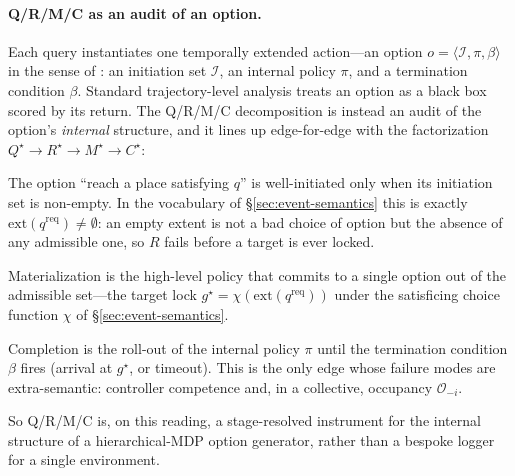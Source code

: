 \documentclass{article}
\begin{document}
\paragraph{Q/R/M/C as an audit of an option.}
Each query instantiates one temporally extended action---an option
$o=\langle \mathcal{I},\pi,\beta\rangle$ in the sense of
\citet{sutton1999between}: an initiation set $\mathcal{I}$, an internal
policy $\pi$, and a termination condition $\beta$. Standard
trajectory-level analysis treats an option as a black box scored by its
return. The Q/R/M/C decomposition is instead an audit of the option's
\emph{internal} structure, and it lines up edge-for-edge with the
factorization $Q^\star\!\rightarrow\!R^\star\!\rightarrow\!M^\star\!\rightarrow\!C^\star$:
\begin{description}[leftmargin=14pt,topsep=2pt,itemsep=2pt]
\item[$Q^\star\!\rightarrow\!R^\star$ (initiation).] The option ``reach a place satisfying $q$'' is well-initiated only when its initiation set is non-empty. In the vocabulary of \S\ref{sec:event-semantics} this is exactly $\mathrm{ext}(q^{\mathrm{req}})\neq\emptyset$: an empty extent is not a bad choice of option but the absence of any admissible one, so $R$ fails before a target is ever locked.
\item[$R^\star\!\rightarrow\!M^\star$ (policy over options).] Materialization is the high-level policy that commits to a single option out of the admissible set---the target lock $g^\star=\chi(\mathrm{ext}(q^{\mathrm{req}}))$ under the satisficing choice function $\chi$ of \S\ref{sec:event-semantics}.
\item[$M^\star\!\rightarrow\!C^\star$ (execution to termination).] Completion is the roll-out of the internal policy $\pi$ until the termination condition $\beta$ fires (arrival at $g^\star$, or timeout). This is the only edge whose failure modes are extra-semantic: controller competence and, in a collective, occupancy $\mathcal{O}_{-i}$.
\end{description}
So Q/R/M/C is, on this reading, a stage-resolved instrument for the
internal structure of a hierarchical-MDP option generator, rather than
a bespoke logger for a single environment.
\end{document}

